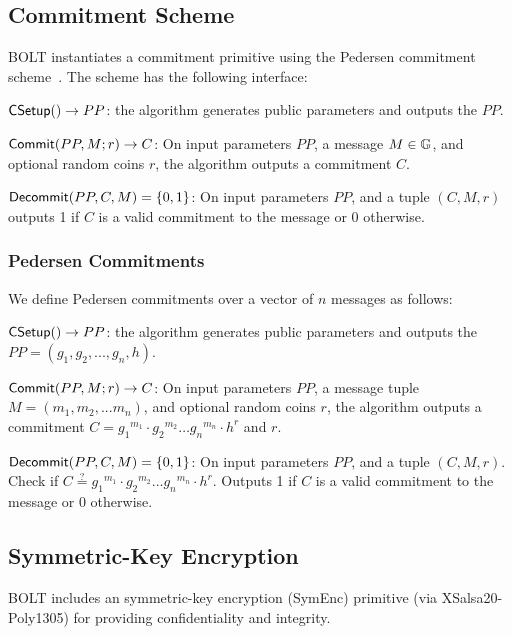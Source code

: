 \documentclass[11pt]{report}
\begin{document}

\subsection{Commitment Scheme}
\label{sec:commit}

BOLT instantiates a commitment primitive using the Pedersen commitment scheme~\cite{PedersenCommits}. The scheme has the following interface:

\medskip \noindent
${\sf CSetup}() \rightarrow PP$:  the algorithm generates public parameters and outputs the $PP$.

\medskip \noindent
${\sf Commit}(PP, M; r) \rightarrow C$: On input parameters $PP$, a message $M \in \mathbb{G}$, and optional random coins $r$, the algorithm outputs a commitment $C$. 

\medskip \noindent
${\sf Decommit}(PP, C, M) =  \{0, 1\}$: On input parameters $PP$, and a tuple $(C, M, r)$ outputs 1 if $C$ is a valid commitment to the message or 0 otherwise.

\subsubsection{Pedersen Commitments}
\label{sec:ped92}

We define Pedersen commitments over a vector of $n$ messages as follows:

\medskip \noindent
${\sf CSetup}() \rightarrow PP$:  the algorithm generates public parameters and outputs the $PP = (g_1, g_2, ..., g_{n}, h)$.

\medskip \noindent
${\sf Commit}(PP, M; r) \rightarrow C$: On input parameters $PP$, a message tuple $M = (m_1, m_2, ... m_n)$, and optional random coins $r$, the algorithm outputs a commitment $C = {g_1}^{m_1} \cdot {g_2}^{m_2} \dots {g_n}^{m_n} \cdot h^r$ and $r$. 

\medskip \noindent
${\sf Decommit}(PP, C, M) =  \{0, 1\}$: On input parameters $PP$, and a tuple $(C, M, r)$. Check if $C \stackrel{?}{=} {g_1}^{m_1} \cdot {g_2}^{m_2} \dots {g_n}^{m_n} \cdot h^r$. Outputs 1 if $C$ is a valid commitment to the message or 0 otherwise. 


\subsection{Symmetric-Key Encryption}
\label{sec:authenc}

BOLT includes an symmetric-key encryption (SymEnc) primitive (via XSalsa20-Poly1305) for providing confidentiality and integrity.
\end{document}
